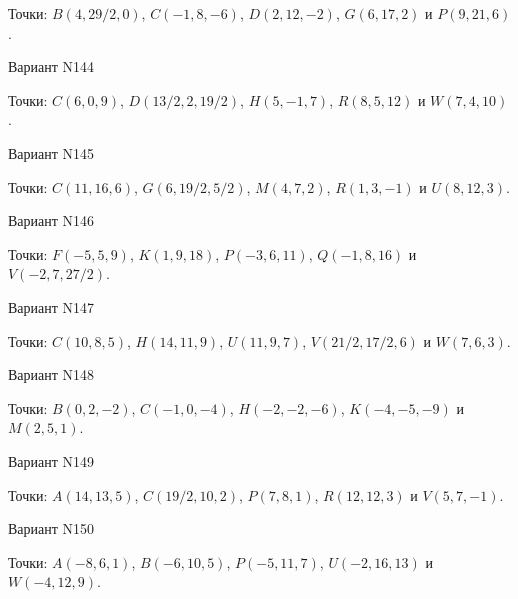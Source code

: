 \documentclass[11pt]{report}
\begin{document}
Точки: $B(4, 29/2, 0)$, $C(-1, 8, -6)$, $D(2, 12, -2)$, $G(6, 17, 2)$ и $P(9, 21, 6)$.

Вариант N144

Точки: $C(6, 0, 9)$, $D(13/2, 2, 19/2)$, $H(5, -1, 7)$, $R(8, 5, 12)$ и $W(7, 4, 10)$.

Вариант N145

Точки: $C(11, 16, 6)$, $G(6, 19/2, 5/2)$, $M(4, 7, 2)$, $R(1, 3, -1)$ и $U(8, 12, 3)$.

Вариант N146

Точки: $F(-5, 5, 9)$, $K(1, 9, 18)$, $P(-3, 6, 11)$, $Q(-1, 8, 16)$ и $V(-2, 7, 27/2)$.

Вариант N147

Точки: $C(10, 8, 5)$, $H(14, 11, 9)$, $U(11, 9, 7)$, $V(21/2, 17/2, 6)$ и $W(7, 6, 3)$.

Вариант N148

Точки: $B(0, 2, -2)$, $C(-1, 0, -4)$, $H(-2, -2, -6)$, $K(-4, -5, -9)$ и $M(2, 5, 1)$.

Вариант N149

Точки: $A(14, 13, 5)$, $C(19/2, 10, 2)$, $P(7, 8, 1)$, $R(12, 12, 3)$ и $V(5, 7, -1)$.

Вариант N150

Точки: $A(-8, 6, 1)$, $B(-6, 10, 5)$, $P(-5, 11, 7)$, $U(-2, 16, 13)$ и $W(-4, 12, 9)$.
\end{document}
